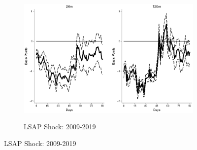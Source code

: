 \documentclass{article}
\begin{document}
\begin{figure}[tbph]
	\begin{subfigure}[t]{\textwidth}
		\begin{center}
			\includegraphics[trim={0cm 0cm 0cm 0cm},clip,height=0.26\textheight,width=1\textwidth]{../Figures/LPs/LagDep-FX/LSAP/AE/LSAPAErho.eps} \\
			\caption{LSAP Shock: 2009-2019} \label{subfig:LPAERHOlsap}
		\end{center}
	\end{subfigure}
	
\end{figure}
\end{document}
